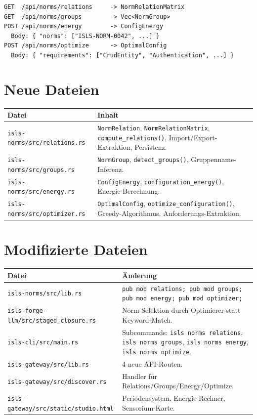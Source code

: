 \documentclass[11pt,a4paper]{article}
\begin{document}
\begin{lstlisting}[style=bash]
GET  /api/norms/relations     -> NormRelationMatrix
GET  /api/norms/groups        -> Vec<NormGroup>
POST /api/norms/energy        -> ConfigEnergy
  Body: { "norms": ["ISLS-NORM-0042", ...] }
POST /api/norms/optimize      -> OptimalConfig
  Body: { "requirements": ["CrudEntity", "Authentication", ...] }
\end{lstlisting}

\section{Neue Dateien}

\begin{longtable}{lp{10cm}}
\toprule
\textbf{Datei} & \textbf{Inhalt} \\
\midrule
\texttt{isls-norms/src/relations.rs}
  & \texttt{NormRelation}, \texttt{NormRelationMatrix}, \texttt{compute\_relations()}, Import/Export-Extraktion, Persistenz. \\
\texttt{isls-norms/src/groups.rs}
  & \texttt{NormGroup}, \texttt{detect\_groups()}, Gruppenname-Inferenz. \\
\texttt{isls-norms/src/energy.rs}
  & \texttt{ConfigEnergy}, \texttt{configuration\_energy()}, Energie-Berechnung. \\
\texttt{isls-norms/src/optimizer.rs}
  & \texttt{OptimalConfig}, \texttt{optimize\_configuration()}, Greedy-Algorithmus, Anforderungs-Extraktion. \\
\bottomrule
\end{longtable}

\section{Modifizierte Dateien}

\begin{longtable}{lp{10cm}}
\toprule
\textbf{Datei} & \textbf{\"Anderung} \\
\midrule
\texttt{isls-norms/src/lib.rs}
  & \texttt{pub mod relations; pub mod groups; pub mod energy; pub mod optimizer;} \\
\texttt{isls-forge-llm/src/staged\_closure.rs}
  & Norm-Selektion durch Optimierer statt Keyword-Match. \\
\texttt{isls-cli/src/main.rs}
  & Subcommands: \texttt{isls norms relations}, \texttt{isls norms groups}, \texttt{isls norms energy}, \texttt{isls norms optimize}. \\
\texttt{isls-gateway/src/lib.rs}
  & 4 neue API-Routen. \\
\texttt{isls-gateway/src/discover.rs}
  & Handler f\"ur Relations/Groups/Energy/Optimize. \\
\texttt{isls-gateway/src/static/studio.html}
  & Periodensystem, Energie-Rechner, Sensorium-Karte. \\
\bottomrule
\end{longtable}
\end{document}

